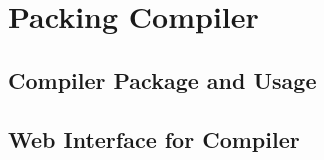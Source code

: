 \section{Packing Compiler \ms}

\subsection{Compiler Package and Usage \ms}

\subsection{Web Interface for Compiler \ms}